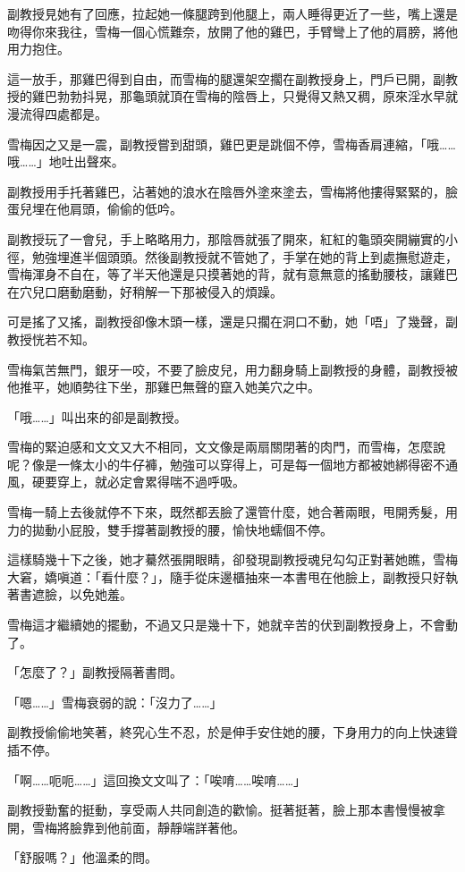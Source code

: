 副教授見她有了回應，拉起她一條腿跨到他腿上，兩人睡得更近了一些，嘴上還是吻得你來我往，雪梅一個心慌難奈，放開了他的雞巴，手臂彎上了他的肩膀，將他用力抱住。

這一放手，那雞巴得到自由，而雪梅的腿還架空擱在副教授身上，門戶已開，副教授的雞巴勃勃抖晃，那龜頭就頂在雪梅的陰唇上，只覺得又熱又稠，原來淫水早就漫流得四處都是。

雪梅因之又是一震，副教授嘗到甜頭，雞巴更是跳個不停，雪梅香肩連縮，「哦……哦……」地吐出聲來。

副教授用手托著雞巴，沾著她的浪水在陰唇外塗來塗去，雪梅將他摟得緊緊的，臉蛋兒埋在他肩頭，偷偷的低吟。

副教授玩了一會兒，手上略略用力，那陰唇就張了開來，紅紅的龜頭突開繃實的小徑，勉強埋進半個頭頭。然後副教授就不管她了，手掌在她的背上到處撫慰遊走，雪梅渾身不自在，等了半天他還是只摸著她的背，就有意無意的搖動腰枝，讓雞巴在穴兒口磨動磨動，好稍解一下那被侵入的煩躁。

可是搖了又搖，副教授卻像木頭一樣，還是只擱在洞口不動，她「唔」了幾聲，副教授恍若不知。

雪梅氣苦無門，銀牙一咬，不要了臉皮兒，用力翻身騎上副教授的身體，副教授被他推平，她順勢往下坐，那雞巴無聲的竄入她美穴之中。

「哦……」叫出來的卻是副教授。

雪梅的緊迫感和文文又大不相同，文文像是兩扇關閉著的肉門，而雪梅，怎麼說呢？像是一條太小的牛仔褲，勉強可以穿得上，可是每一個地方都被她綁得密不通風，硬要穿上，就必定會累得喘不過呼吸。

雪梅一騎上去後就停不下來，既然都丟臉了還管什麼，她合著兩眼，甩開秀髮，用力的拋動小屁股，雙手撐著副教授的腰，愉快地蠕個不停。

這樣騎幾十下之後，她才驀然張開眼睛，卻發現副教授魂兒勾勾正對著她瞧，雪梅大窘，嬌嗔道：「看什麼？」，隨手從床邊櫃抽來一本書甩在他臉上，副教授只好執著書遮臉，以免她羞。

雪梅這才繼續她的擺動，不過又只是幾十下，她就辛苦的伏到副教授身上，不會動了。

「怎麼了？」副教授隔著書問。

「嗯……」雪梅衰弱的說：「沒力了……」

副教授偷偷地笑著，終究心生不忍，於是伸手安住她的腰，下身用力的向上快速聳插不停。

「啊……呃呃……」這回換文文叫了：「唉唷……唉唷……」

副教授勤奮的挺動，享受兩人共同創造的歡愉。挺著挺著，臉上那本書慢慢被拿開，雪梅將臉靠到他前面，靜靜端詳著他。

「舒服嗎？」他溫柔的問。

